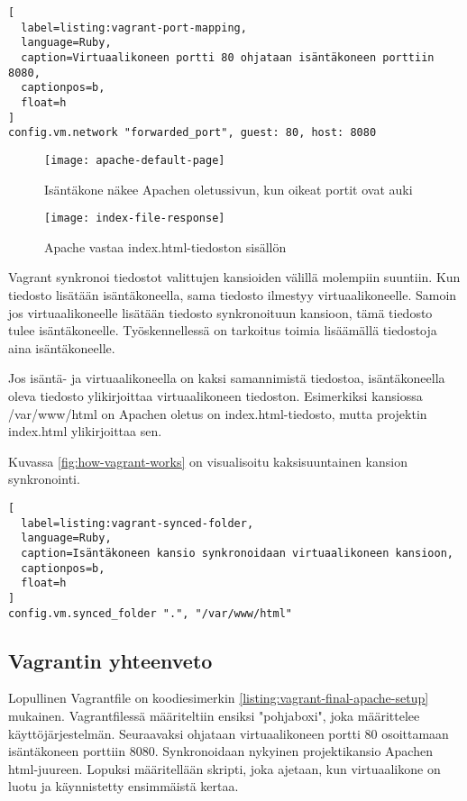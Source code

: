 \begin{lstlisting}[
  label=listing:vagrant-port-mapping,
  language=Ruby,
  caption=Virtuaalikoneen portti 80 ohjataan isäntäkoneen porttiin 8080,
  captionpos=b,
  float=h
]
config.vm.network "forwarded_port", guest: 80, host: 8080
\end{lstlisting}

\begin{figure}[h]
  \texttt{[image: apache-default-page]}
  \caption{Isäntäkone näkee Apachen oletussivun, kun oikeat portit ovat auki}
  \label{fig:apache-default-page}
\end{figure}

\begin{figure}[h]
  \texttt{[image: index-file-response]}
  \caption{Apache vastaa index.html-tiedoston sisällön}
  \label{fig:index-file-response}
\end{figure}

Vagrant synkronoi tiedostot valittujen kansioiden välillä molempiin suuntiin. Kun tiedosto lisätään isäntäkoneella, sama tiedosto ilmestyy virtuaalikoneelle. Samoin jos virtuaalikoneelle lisätään tiedosto synkronoituun kansioon, tämä tiedosto tulee isäntäkoneelle. Työskennellessä on tarkoitus toimia lisäämällä tiedostoja aina isäntäkoneelle.


Jos isäntä- ja virtuaalikoneella on kaksi samannimistä tiedostoa, isäntäkoneella oleva tiedosto ylikirjoittaa virtuaalikoneen tiedoston. Esimerkiksi kansiossa /var/www/html on Apachen oletus on index.html-tiedosto, mutta projektin index.html ylikirjoittaa sen.

Kuvassa \ref{fig:how-vagrant-works} on visualisoitu kaksisuuntainen kansion synkronointi.

\begin{lstlisting}[
  label=listing:vagrant-synced-folder,
  language=Ruby,
  caption=Isäntäkoneen kansio synkronoidaan virtuaalikoneen kansioon,
  captionpos=b,
  float=h
]
config.vm.synced_folder ".", "/var/www/html"
\end{lstlisting}

\subsection{Vagrantin yhteenveto}

Lopullinen Vagrantfile on koodiesimerkin \ref{listing:vagrant-final-apache-setup} mukainen. Vagrantfilessä määriteltiin ensiksi "pohjaboxi", joka määrittelee käyttöjärjestelmän. Seuraavaksi ohjataan virtuaalikoneen portti 80 osoittamaan isäntäkoneen porttiin 8080. Synkronoidaan nykyinen projektikansio Apachen html-juureen. Lopuksi määritellään skripti, joka ajetaan, kun virtuaalikone on luotu ja käynnistetty ensimmäistä kertaa.

